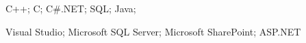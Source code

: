 \begin{cvline}
  \cvsingleline 
    {
      \begin{cvitems}
          \item {C++; C; C\#.NET; SQL; Java;}
          \item {Visual Studio; Microsoft SQL Server; Microsoft SharePoint; ASP.NET}
      \end{cvitems}
    }
\end{cvline}
